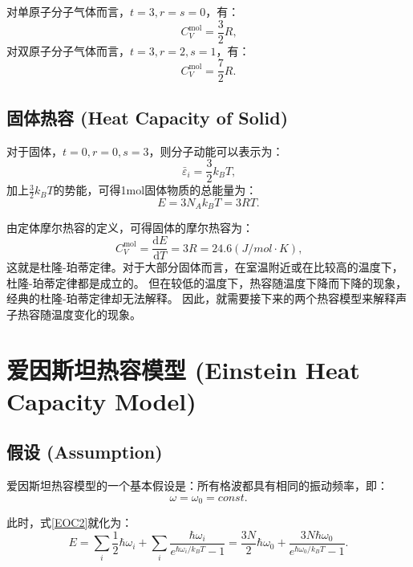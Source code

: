\documentclass[declarePage]{ecnuthesis}
\begin{document}
对单原子分子气体而言，$t=3,r=s=0$，有：
\begin{equation}
    C_V^{\mathrm{mol}} = \frac{3}{2} R \text{,}
\end{equation}
对双原子分子气体而言，$t=3,r=2,s=1$，有：
\begin{equation}
    C_V^{\mathrm{mol}} = \frac{7}{2} R \text{.} 
\end{equation}

\subsection{固体热容 (Heat Capacity of Solid)}

对于固体，$t=0,r=0,s=3$，则分子动能可以表示为：
\begin{equation}
    \bar \varepsilon _i = \frac{3}{2} k_BT \text{,}
\end{equation}
加上$\frac{3}{2} k_BT$的势能，可得1mol固体物质的总能量为：
\begin{equation}
    E = 3N_A k_B T = 3RT \text{.}
\end{equation}

由定体摩尔热容的定义，可得固体的摩尔热容为：
\begin{equation}
    C_V^{\mathrm{mol}} = \frac{\mathrm{d}E}{\mathrm{d}T} = 3R = 24.6(J/mol\cdot K) \text{,} 
\end{equation}
这就是杜隆-珀蒂定律。对于大部分固体而言，在室温附近或在比较高的温度下，杜隆-珀蒂定律都是成立的。%
但在较低的温度下，热容随温度下降而下降的现象，经典的杜隆-珀蒂定律却无法解释。%
因此，就需要接下来的两个热容模型来解释声子热容随温度变化的现象。

\section{爱因斯坦热容模型 (Einstein Heat Capacity Model)}

\subsection{假设 (Assumption)}

爱因斯坦热容模型的一个基本假设是：所有格波都具有相同的振动频率，即：
\begin{equation}
    \omega = \omega_0 = const \text{.} 
\end{equation}

此时，式\ref{EOC2}就化为：
\begin{equation}
    E = \sum_i \frac{1}{2}\hbar \omega_i + \sum_i \frac{\hbar \omega_i}{e^{\hbar \omega_i / k_B T}-1} = \frac{3N}{2}\hbar\omega_0 + \frac{3N\hbar\omega_0}{e^{\hbar \omega_0 / k_B T}-1} \text{.}
\end{equation}
\end{document}
